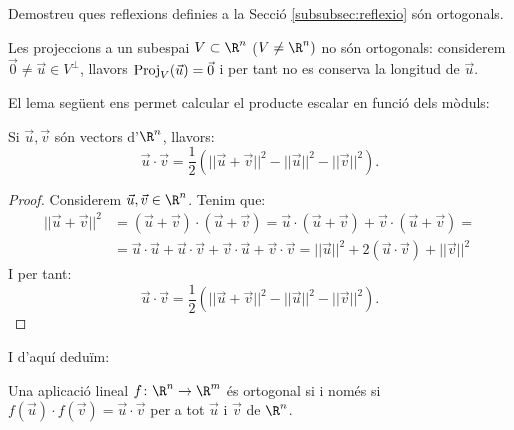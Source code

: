 \begin{exercici}
Demostreu ques reflexions definies a la Secció \ref{subsubsec:reflexio} són ortogonals.
\end{exercici}
\begin{exemple}
Les projeccions a un subespai $V\subset \R^n$ ($V\neq \R^n)$ no són ortogonals: considerem $\vec 0 \neq \vec u \in V^\perp$, llavors $\operatorname{Proj}_V(\vec u)=\vec 0$ i per tant no es conserva la longitud de $\vec u$.
\end{exemple}

El lema següent ens permet calcular el producte escalar en funció dels mòduls:
\begin{lema}\label{lema:prod_esc_modul}
Si $\vec u, \vec v$ són vectors d'$\R^n$, llavors:
\[
\vec u \cdot \vec v = \frac{1}{2}\left(||\vec u + \vec v||^2 - ||\vec u||^2 - ||\vec v||^2\right).
\]
\end{lema}
\begin{proof}
Considerem $\vec u, \vec v \in \R^n$. Tenim que:
\begin{align*}
||\vec u + \vec v||^2 & =(\vec u+\vec v)\cdot(\vec u+\vec v) = \vec u \cdot (\vec u+ \vec v) + \vec v \cdot (\vec u+ \vec v) = \\
 & = \vec u \cdot \vec u  + \vec u \cdot \vec v + \vec v \cdot \vec u+\vec v \cdot \vec v = ||\vec u||^2+2 (\vec u \cdot \vec v) + ||\vec v||^2
\end{align*}
I per tant:
\[
\vec u \cdot \vec v = \frac{1}{2}\left(||\vec u + \vec v||^2 - ||\vec u||^2 - ||\vec v||^2\right).
\]
\end{proof}
I d'aquí deduïm:
\begin{teorema}
Una aplicació lineal $f\colon \R^n \to \R^m$ és ortogonal si i només si $f(\vec u)\cdot f(\vec v)=\vec u \cdot \vec v$ per a tot $\vec u$ i $\vec v$ de $\R^n$.
\end{teorema}
